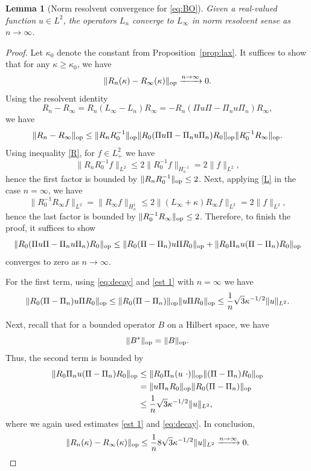 \documentclass [11pt] {article}
\newtheorem{lem}[thm]{Lemma}
\newcommand{\<}{\langle}
\renewcommand{\>}{\rangle}
\newcommand{\op}{\textup{op}}
\begin{document}
\begin{lem}[Norm resolvent convergence for \eqref{eq:BO}]
\label{lem:resolv 2}
Given a real-valued function $u\in L^2$, the operators $L_n$ converge to $L_\infty$ in norm resolvent sense as $n\to\infty$.
\end{lem}
\begin{proof}
Let $\kappa_0$ denote the constant from Proposition~\ref{prop:lax}.
It suffices to show that for any $\kappa\geq\kappa_0$, we have
\begin{equation*}
\| R_n(\kappa) - R_\infty(\kappa) \|_{\op} \xrightarrow{n \rightarrow \infty} 0  .
\end{equation*}
  Using the resolvent identity 
  \[R_n - R_{\infty} = R_{n}(L_\infty - L_n )R_{\infty} = - R_n (\Pi u\Pi  - \Pi_nu\Pi_n)R_\infty ,
  \]
  we have
  \[
  \| R_n - R_{\infty}\|_{\op} \le \| R_{n}R_0^{-1}\|_{\op} \| R_0(\Pi u\Pi  - \Pi_nu\Pi_n)R_0\|_{\op} \| R_{0}^{-1}R_{\infty}\|_\op.
  \]
  Using inequality \eqref{R}, for $f\in L^2_{+}$ we have
  \[
  \| R_{n}R_0^{-1}f \|_{L^2} \le 2 \| R_0^{-1}f\|_{H^{-1}_{\kappa}} = 2\| f\|_{L^2},
  \]
  hence the first factor is bounded by $ \| R_{n}R_0^{-1}\|_{\op} \le 2$.
  Next, applying \eqref{L} in the case $n=\infty$, we have
  \[
  \| R_{0}^{-1}R_{\infty} f\|_{L^2} = \| R_{\infty} f\|_{H^1_{\kappa}} \le 2\|(L_{\infty} + \kappa) R_{\infty} f \|_{L^2} = 2 \| f\|_{L^2},
  \]
  hence the last factor is bounded by $\| R_{0}^{-1}R_{\infty}\|_\op \le 2$.
Therefore, to finish the proof, it suffices to show
\begin{equation*}
\| R_0(\Pi u\Pi - \Pi_nu\Pi_n) R_0\| _{\op} \le \| R_0(\Pi-\Pi_n) u \Pi R_0 \|_{\op}  + \| R_0\Pi_nu (\Pi-\Pi_n) R_0 \|_{\op}
\end{equation*}
converges to zero as $n \rightarrow \infty$.

For the first term, using \eqref{eq:decay} and \eqref{est 1} with $n=\infty$ we have
\[
\| R_0(\Pi-\Pi_n) u \Pi R_0 \|_{\op} \le \| R_0(\Pi-\Pi_n)\|_\op \| u \Pi R_0 \|_{\op} \le \frac{1}{n}\sqrt{3}\kappa^{-1/2}\| u\|_{L^2}.
\]

Next, recall that for a bounded operator $B$ on a Hilbert space, we have
\begin{equation}
\|B^*\|_{\op} = \|B\|_{\op}.
\label{B*B}
\end{equation}
Thus, the second term is bounded by
\begin{align*}
\| R_0\Pi_nu (\Pi-\Pi_n) R_0 \|_{\op} &\le \| R_0\Pi_n(u \ \cdot) \|_{\op}\|(\Pi-\Pi_n) R_0 \|_{\op}\\
& = \| u \Pi_n R_0\|_{\op}\| R_0 (\Pi-\Pi_n)\|_{\op}\\
& \le \frac{1}{n}\sqrt{3}\kappa^{-1/2}\| u\|_{L^2},
\end{align*}
where we again used estimates \eqref{est 1} and \eqref{eq:decay}. In conclusion,
\[
\| R_n(\kappa) - R_\infty(\kappa) \|_{\op} \le \frac{1}{n}8\sqrt{3}\kappa^{-1/2}\| u\|_{L^2} \xrightarrow{n \to \infty} 0. \qedhere
\]

\end{proof}
\end{document}
